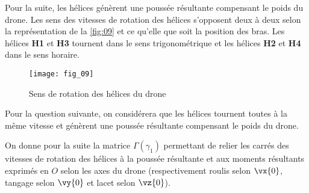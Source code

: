 Pour la suite, les hélices génèrent une poussée résultante compensant le poids du drone.
Les sens des vitesses de rotation des hélices s’opposent deux à deux selon la représentation
de la \autoref{fig:09} et ce qu’elle que soit la position des bras. Les hélices \textbf{H1} et \textbf{H3} tournent dans
le sens trigonométrique et les hélices \textbf{H2} et \textbf{H4} dans le sens horaire.

\begin{figure}[H]
\centering
\texttt{[image: fig\_09]}
\caption{\label{fig:09} ­Sens de rotation des hélices du drone}
\end{figure}

\ifprof
\begin{corrige}

\end{corrige}
\else
\fi
Pour la question suivante, on considérera que les hélices tournent toutes à la même vitesse
et génèrent une poussée résultante compensant le poids du drone.

\ifprof
\begin{corrige}
\end{corrige}
\else
\fi

On donne pour la suite la matrice $\Gamma (\gamma_1)$ permettant de relier les carrés des vitesses de rotation
des hélices à la poussée résultante et aux moments résultants exprimés en $O$ selon les axes
du drone (respectivement roulis selon $\vx{0}$, tangage selon $\vy{0}$ et lacet selon $\vz{0}$).

